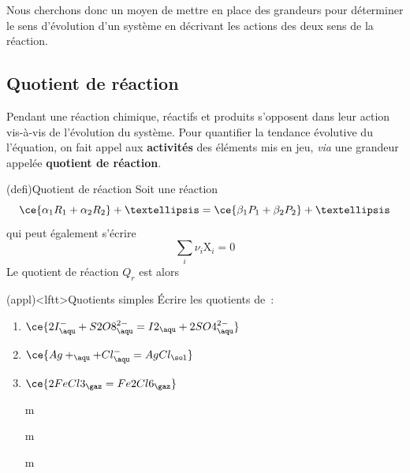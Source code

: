 \documentclass[../../main/main.tex]{subfiles}
\begin{document}
Nous cherchons donc un moyen de mettre en place des grandeurs pour
déterminer le sens d'évolution d'un système en décrivant les actions des
deux sens de la réaction.

\subsection{Quotient de réaction}

Pendant une réaction chimique, réactifs et produits s'opposent dans leur action
vis-à-vis de l'évolution du système.
Pour quantifier la tendance évolutive du l'équation, on fait appel aux
\textbf{activités} des éléments mis en jeu, \textit{via} une grandeur appelée
\textbf{quotient de réaction}.

\begin{tcb*}[label=quoreac](defi){Quotient de réaction}
	Soit une réaction
	\[\ce{\alpha_1R_1 + \alpha_2R_2} +…
		=
		\ce{\beta_1P_1 +\beta_2P_2}+…\]
	qui peut également s'écrire
	\[ \sum_i \nu_i\mathrm{X}_i = 0\]
	Le quotient de réaction $Q_r$ est alors
	\psw{%
		\[
			\boxed{Q_r = \frac{a(\ce{P_1})^{\beta_1} \times
					a(\ce{P_2})^{\beta_2} \times…}{
					a(\ce{R_1})^{\alpha_1} \times
					a(\ce{R_2})^{\alpha_2} \times…}}
			\qou
			\boxed{Q_r = \prod_i a(\ce{X_i})^{\nu_i}}
		\]
	}%
\end{tcb*}

\begin{tcb}[label=exem:qr, sidebyside, righthand ratio=.55]
	(appl)<lftt>{Quotients simples}
	Écrire les quotients de~:
	\begin{enumerate}
		\item $\ce{2I^-_{\aqu} + S2O8^{2-}_{\aqu} = I2_{\aqu} +2SO4^{2-}_{\aqu}}$
		\item $\ce{Ag+_{\aqu} + Cl^-_{\aqu} = AgCl_{\sol}}$
		\item $\ce{2FeCl3_{\gaz} = Fe2Cl6_{\gaz}}$
	\end{enumerate}
	\tcblower
	\vspace{+15pt}
	\begin{enumerate}
		\item[m]
		      \psw{%
			      \[
				      Q_r = \frac{
					      [\ce{I2}]\times[\ce{SO4^{2-}}]^2
				      }{
					      [\ce{I-}]^2\times [\ce{S2O8^{2-}}]
				      }%
			      \]
		      }%
		\item[m]
		      \psw{%
			      \[
				      Q_r =
				      \frac{c{^\circ}^2
				      }{
					      [\ce{Ag+}]\times[\ce{Cl-}]
				      }%
			      \]
		      }%
		\item[m]
		      \psw{%
			      \[
				      Q_r = \frac{P_{\ce{Fe2Cl6}}/P^\circ
				      }{
					      P_{\ce{FeCl3}}{}^2/P^\circ{}^2}
				      =
				      P^\circ\frac{P_{\ce{Fe2Cl6}}
				      }{
					      P_{\ce{FeCl3}}{}^2
				      }%
			      \]
		      }%
	\end{enumerate}
	\vspace{-15pt}
\end{tcb}
\end{document}

